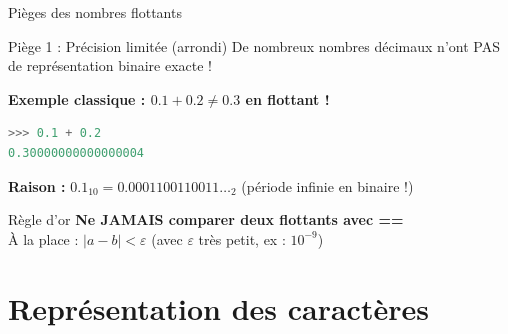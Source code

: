 \documentclass[aspectratio=1610]{beamer}
\begin{document}
\begin{frame}[fragile]{ Pièges des nombres flottants}

  \begin{alertblock}{Piège 1 : Précision limitée (arrondi)}
    De nombreux nombres décimaux n'ont PAS de représentation binaire exacte !
  \end{alertblock}

  \vspace{0.3cm}

  \textbf{Exemple classique : $0.1 + 0.2 \neq 0.3$ en flottant !}

  \begin{lstlisting}[language=Python,basicstyle=\small\ttfamily]
>>> 0.1 + 0.2
0.30000000000000004
  \end{lstlisting}

  \vspace{0.3cm}

  \textbf{Raison :} $0.1_{10} = 0.0001100110011\ldots_2$ (période infinie en binaire !)

  \vspace{0.5cm}

  \begin{exampleblock}{Règle d'or}
    \textbf{Ne JAMAIS comparer deux flottants avec ==} \\
    À la place : $|a - b| < \varepsilon$ (avec $\varepsilon$ très petit, ex : $10^{-9}$)
  \end{exampleblock}

\end{frame}



\section{Représentation des caractères}
\end{document}
